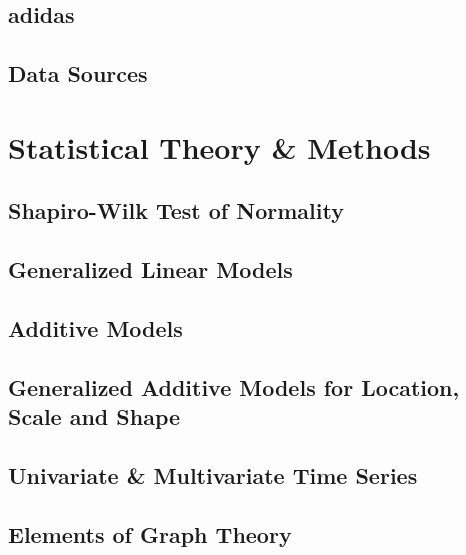\documentclass[11pt, twoside]{article}
\numberwithin{equation}{section}
\numberwithin{table}{section}
\numberwithin{figure}{section}
\begin{document}
\subsection{adidas} \label{ssec:adidas}

\subsection{Data Sources} \label{ssec:data_sources}

%
\newpage

\thispagestyle{plain}
\section{Statistical Theory \& Methods} \label{sec:theory_and_methods}

\subsection{Shapiro-Wilk Test of Normality} \label{ssec:shapiro_wilk}

\subsection{Generalized Linear Models} \label{ssec:glm}

%
\subsection{Additive Models} \label{ssec:gam}

\subsection{Generalized Additive Models for Location, Scale and Shape} \label{ssec:gamlss}

\subsection{Univariate \& Multivariate Time Series} \label{ssec:time_series}

\subsection{Elements of Graph Theory} \label{ssec:graph_theory}

\end{document}
